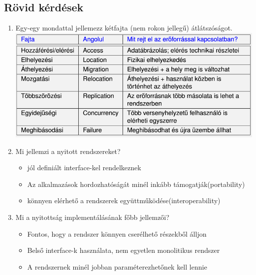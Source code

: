 \documentclass[twoside, a4paper, 12pt]{article}
\begin{document}
\subsection{Rövid kérdések}
\begin{enumerate}
    \item Egy-egy mondattal jellemezz kétfajta (nem rokon jellegű)
        átlátszóságot.
        \includegraphics[scale=0.5]{images/P5.PNG}
    \item Mi jellemzi a nyitott rendszereket?
        \begin{itemize}
            \item jól definiált interface-kel rendelkeznek 
            \item Az alkalmazások hordozhatóságát minél inkább
                támogatják(portability)
            \item könnyen elérhető a rendszerek együttműködése(interoperability)
        \end{itemize}
    \item Mi a nyitottság implementálásának főbb jellemzői?
        \begin{itemize}
            \item Fontos, hogy a rendszer könnyen cserélhető részekből álljon
            \item Belső interface-k használata, nem egyetlen monolitikus
                rendszer
            \item A rendszernek minél jobban paraméterezhetőnek kell lennie


\end{itemize}
\end{enumerate}
\end{document}
